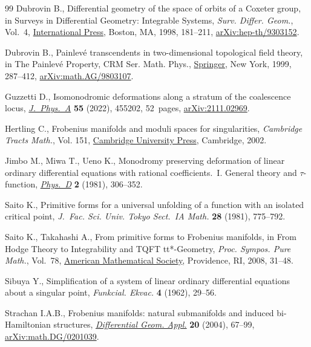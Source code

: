 \documentclass[10pt,a4paper]{amsart}
\numberwithin{equation}{section}
\begin{document}
\begin{thebibliography}{99}
Dubrovin B., Differential geometry of the space of orbits of a {C}oxeter group,
 in Surveys in {D}ifferential {G}eometry: {I}ntegrable {S}ystems,
 \textit{Surv. Differ. Geom.}, Vol.~4, \href{https://doi.org/10.4310/SDG.1998.v4.n1.a4}{International Press}, Boston, MA, 1998,
 181--211, \href{https://arxiv.org/abs/hep-th/9303152}{arXiv:hep-th/9303152}.

Dubrovin B., Painlev\'e transcendents in two-dimensional topological field
 theory, in The {P}ainlev\'e {P}roperty, CRM Ser. Math. Phys., \href{https://doi.org/10.1007/978-1-4612-1532-5_6}{Springer}, New
 York, 1999, 287--412, \href{https://arxiv.org/abs/math.AG/9803107}{arXiv:math.AG/9803107}.

Guzzetti D., Isomonodromic deformations along a stratum of the coalescence
 locus, \href{https://doi.org/10.1088/1751-8121/ac9ba8}{\textit{J.~Phys.~A}} \textbf{55} (2022), 455202, 52~pages,
 \href{https://arxiv.org/abs/2111.02969}{arXiv:2111.02969}.

Hertling C., Frobenius manifolds and moduli spaces for singularities,
 \textit{Cambridge Tracts Math.}, Vol. 151, \href{https://doi.org/10.1017/CBO9780511543104}{Cambridge University Press},
 Cambridge, 2002.

Jimbo M., Miwa T., Ueno K., Monodromy preserving deformation of linear ordinary
 differential equations with rational coefficients.~{I}. {G}eneral theory and
 {$\tau $}-function, \href{https://doi.org/10.1016/0167-2789(81)90013-0}{\textit{Phys.~D}} \textbf{2} (1981), 306--352.

Saito K., Primitive forms for a universal unfolding of a function with an
 isolated critical point, \textit{J.~Fac. Sci. Univ. Tokyo Sect.~IA Math.}
 \textbf{28} (1981), 775--792.

Saito K., Takahashi A., From primitive forms to {F}robenius manifolds, in From
 {H}odge {T}heory to {I}ntegrability and {TQFT} tt*-{G}eometry, \textit{Proc.
 Sympos. Pure Math.}, Vol.~78, \href{https://doi.org/10.1090/pspum/078/2483747}{American Mathematical Society}, Providence, RI,
 2008, 31--48.

Sibuya Y., Simplification of a system of linear ordinary differential equations
 about a singular point, \textit{Funkcial. Ekvac.} \textbf{4} (1962), 29--56.

Strachan I.A.B., Frobenius manifolds: natural submanifolds and induced
 bi-{H}amiltonian structures, \href{https://doi.org/10.1016/j.difgeo.2003.10.001}{\textit{Differential Geom. Appl.}} \textbf{20}
 (2004), 67--99, \href{https://arxiv.org/abs/math.DG/0201039}{arXiv:math.DG/0201039}.

\end{thebibliography}
\end{document}

